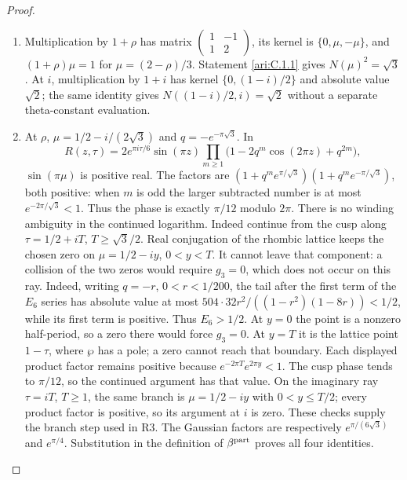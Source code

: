 \begin{proof}
\begin{enumerate}[label=\arabic*.,leftmargin=*]
\item Multiplication by $1+\rho$ has matrix
$\left(\begin{smallmatrix}1&-1\\1&2\end{smallmatrix}\right)$,
its kernel is $\{0,\mu,-\mu\}$, and $(1+\rho)\mu=1$ for
$\mu=(2-\rho)/3$. Statement \ref{ari:C.1.1} gives $N(\mu)^2=\sqrt3$.
At $i$, multiplication by $1+i$
has kernel $\{0,(1-i)/2\}$ and absolute value $\sqrt2$; the same
identity gives $N((1-i)/2,i)=\sqrt2$ without a separate theta-constant
evaluation.

\item At $\rho$, $\mu=1/2-i/(2\sqrt3)$ and $q=-e^{-\pi\sqrt3}$. In
\[
 R(z,\tau)=2e^{\pi i\tau/6}\sin(\pi z)
 \prod_{m\ge1}\bigl(1-2q^m\cos(2\pi z)+q^{2m}\bigr),
\]
$\sin(\pi\mu)$ is positive real. The factors are
$(1+q^m e^{\pi/\sqrt3})(1+q^m e^{-\pi/\sqrt3})$, both positive:
when $m$ is odd the larger subtracted number is at most
$e^{-2\pi/\sqrt3}<1$. Thus the phase is exactly $\pi/12$ modulo
$2\pi$. There is no winding ambiguity in the continued logarithm.
Indeed continue from the cusp along $\tau=1/2+iT$,
$T\ge\sqrt3/2$. Real conjugation of the rhombic lattice keeps the
chosen zero on $\mu=1/2-iy$, $0<y<T$. It cannot leave that component:
a collision of the two zeros would require $g_3=0$, which does not
occur on this ray. Indeed, writing $q=-r$, $0<r<1/200$,
the tail after the first term of the $E_6$ series has absolute value
at most $504\cdot32r^2/((1-r^2)(1-8r))<1/2$, while its
first term is positive. Thus $E_6>1/2$. At $y=0$ the point is a nonzero half-period, so a zero there
would force $g_3=0$. At $y=T$ it is the lattice point
$1-\tau$, where $\wp$ has a pole; a zero cannot reach that boundary. Each displayed product factor remains
positive because $e^{-2\pi T}e^{2\pi y}<1$. The cusp phase tends to
$\pi/12$, so the continued argument has that value. On the imaginary
ray $\tau=iT$, $T\ge1$, the same branch is
$\mu=1/2-iy$ with $0<y\le T/2$; every product factor is positive,
so its argument at $i$ is zero. These checks supply the branch step
used in R3. The Gaussian factors are respectively
$e^{\pi/(6\sqrt3)}$ and $e^{\pi/4}$. Substitution in the definition of
$\beta^{\rm part}$ proves all four identities.
\end{enumerate}
\end{proof}

